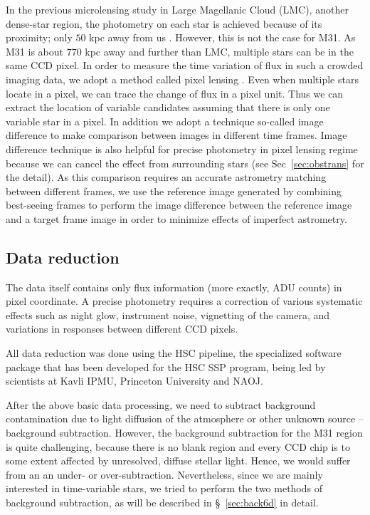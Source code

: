 \documentclass[iop, apj]{emulateapj}
\newcommand{\?}{\stackrel{?}{=}}
\begin{document}
In the previous microlensing study in Large Magellanic Cloud (LMC), another dense-star region, the photometry on each star is achieved because of its proximity; only $50$ kpc away from us \citep{Alocketal:00}. However, this is not the case for M31. As M31 is about $770$ kpc away and further than LMC, multiple stars can be in the same CCD pixel. 
In order to measure the time variation of flux in such a crowded imaging data, we adopt a method called pixel lensing \citep{AlardLupton:98}. Even when multiple stars locate in a pixel, we can trace the change of flux in a pixel unit. Thus we can extract the location of variable candidates assuming that there is only one variable star in a pixel. In addition we adopt a technique so-called image difference to make comparison between images in different time frames. 
Image difference technique is also helpful for precise photometry in pixel lensing regime because we can cancel the effect from surrounding stars (see Sec~\ref{sec:obstrans} for the detail). As this comparison requires an accurate astrometry matching between different frames, we use the reference image generated by combining best-seeing frames to perform the image difference between the reference image and a target frame image in order to minimize effects of imperfect astrometry. 


\subsection{Data reduction}
\label{sec:obsreduce}
\label{sec:obstrans}
The data itself contains only flux information (more exactly, ADU counts) in pixel coordinate. 
A precise photometry requires a correction of various systematic effects such as night glow, instrument noise, vignetting of the camera, and variations in responses between different CCD pixels.  

All data reduction was done using the HSC pipeline, the specialized software package that has been developed for the HSC SSP program, being led by scientists at Kavli IPMU, Princeton University and NAOJ. 

After the above basic data processing, we need to subtract background contamination due to light diffusion of the atmosphere or other unknown source -- background subtraction. However, the background subtraction for the M31 region is quite challenging, because there is no blank region and every CCD chip is to some extent affected by unresolved, diffuse stellar light. Hence, we would suffer from an an under- or over-subtraction. Nevertheless, since we are mainly interested in time-variable stars, we tried to perform the two methods of background subtraction, as will be described in \S~\ref{sec:back6d} in detail. 
\end{document}

